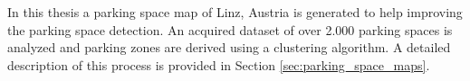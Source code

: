 In this thesis a parking space map of Linz, Austria is generated to help improving the parking space detection. An acquired dataset of over 2.000 parking spaces is analyzed and parking zones are derived using a clustering algorithm. A detailed description of this process is provided in Section \ref{sec:parking_space_maps}.